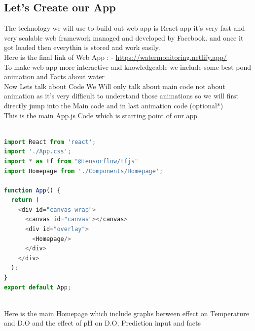 \subsection{Let's Create our App} 
The technology we will use to build out web app is React app it's very fast and very scalable web framework managed and developed by Facebook. and once it got loaded then everythin is stored and work easily.\\

Here is the final link of Web App : - \url{https://watermonitoring.netlify.app/}\\

To make web app more interactive and knowledgeable we include some best pond animation and Facts about water\\

Now Lets talk about Code We Will only talk about main code not about animation as it's very difficult to understand those animations so we will first directly jump into the Main code and in last animation code (optional*) \\

This is the main App.js Code which is starting point of our app\\

\begin{lstlisting}[language=javascript, caption={Water Monitoring App}]

import React from 'react';
import './App.css';
import * as tf from "@tensorflow/tfjs"
import Homepage from './Components/Homepage';

function App() {
  return (
    <div id="canvas-wrap">
      <canvas id="canvas"></canvas>
      <div id="overlay">
        <Homepage/>
      </div>
    </div>
  );
}
export default App;

\end{lstlisting}\\

Here is the main Homepage which include graphs between effect on Temperature and D.O and the effect of pH on D.O, Prediction input and facts \\

